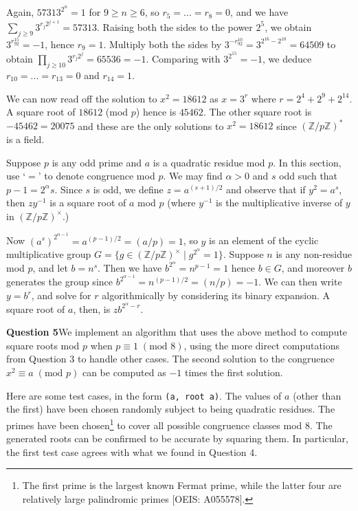 \documentclass[12pt]{article}
\newcommand{\textmod}[1]{\;(\text{mod }#1)}
\begin{document}
Again, \(57313^{2^n}=1\) for \(9\geq n \geq 6\), so \(r_5=...=r_8=0\), and we
have \(\sum_{j\geq 9}3^{r_j2^{j+1}} = 57313\). Raising both the sides to the
power \(2^5\), we obtain \(3^{r_92^{15}}=-1\), hence \(r_9 = 1\). Multiply both
the sides by \(3^{-r_92^{10}} = 3^{2^{16}-2^{10}} = 64509\) to obtain
\(\prod_{j\geq 10}3^{r_j2^j} = 65536 = -1\). Comparing with \(3^{2^{15}} = -1\),
we deduce \(r_{10} = ... = r_{13}=0\) and \(r_{14}=1\).

We can now read off the solution to \(x^2 = 18612\) as \(x= 3^r\) where
\(r=2^4+2^9+2^{14}\). A square root of \(18612\) (mod \(p\)) hence is
\(45462\). The other square root is \(-45462= 20075\) and these are the only
solutions to \(x^2 =18612\) since \((\mathbb{Z}/p\mathbb{Z})^\ast\) is a field.

\hfill 

Suppose \(p\) is any odd prime and \(a\) is a quadratic residue mod \(p\). In
this section, use `\(=\)' to denote congruence mod \(p\). We may find \(\alpha >
0\) and \(s\) odd such that \(p-1 = 2^\alpha s\). Since \(s\) is odd, we
define \(z = a^{(s+1)/2}\) and observe that if \(y^2 = a^s\), then \(zy^{-1}\)
is a square root of \(a\) mod \(p\) (where \(y^{-1}\) is the multiplicative inverse of
\(y\) in \((\mathbb{Z}/p\mathbb{Z})^\times\).)

Now \((a^s)^{2^{\alpha - 1}} = a^{(p-1)/2} = (a/p)= 1\), so \(y\) is an  element of the
cyclic multiplicative group \(G=\{g\in
(\mathbb{Z}/p\mathbb{Z})^\times\;|\;g^{2^{\alpha}} = 1\}\). Suppose \(n\) is any
non-residue mod \(p\), and let \(b=n^s\). Then we have \(b^{2^\alpha}=n^{p-1} =
1\) hence \(b\in G\), and moreover \(b\) generates the group since
\(b^{2^{\alpha - 1}}=n^{(p-1)/2} = (n/p)=-1\). We can then write \(y = b^r\),
and solve for \(r\) algorithmically by considering its binary expansion. A
square root of \(a\), then, is \(zb^{2^{\alpha}-r}\).

\textbf{Question 5}\quad We implement an algorithm that uses the above method to
compute square roots mod \(p\) when \(p\equiv 1 \textmod{8}\), using the more
direct computations from Question 3 to handle other cases. The second solution
to the congruence \(x^2\equiv a \textmod{p}\) can be computed as \(-1\) times the first
solution. 

Here are some test cases, in the form \texttt{(a, root a)}. The values of \(a\)
(other than the first) have been chosen randomly subject to being quadratic
residues. The primes have been chosen\footnote{The first prime is the largest
known Fermat prime, while the latter four are relatively large palindromic
primes [OEIS: A055578].} to cover all possible congruence classes mod \(8\). The
generated roots can be confirmed to be accurate by squaring them. In particular,
the first test case agrees with what we found in Question 4.
\end{document}
